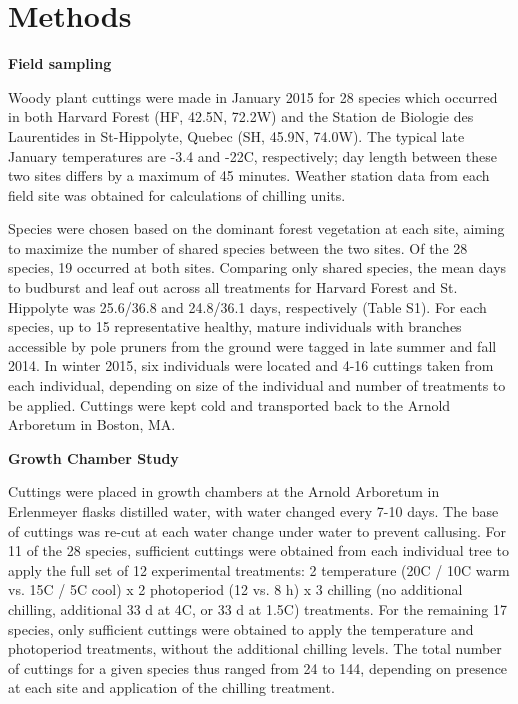 \documentclass[11pt]{article}
\begin{document}
\section*{Methods}
\textbf{Field sampling}

Woody plant cuttings were made in January 2015 for 28 species which occurred in both Harvard Forest (HF, 42.5\degree N, 72.2\degree W) and the Station de Biologie des Laurentides in St-Hippolyte, Quebec (SH, 45.9\degree N, 74.0\degree W). The typical late January temperatures are -3.4 and -22\degree C, respectively; day length between these two sites differs by a maximum of 45 minutes. Weather station data from each field site was obtained for calculations of chilling units. 

Species were chosen based on the dominant forest vegetation at each site, aiming to maximize the number of shared species between the two sites. Of the 28 species, 19 occurred at both sites. Comparing only shared species, the mean days to budburst and leaf out across all treatments for Harvard Forest and St. Hippolyte was 25.6/36.8 and 24.8/36.1 days, respectively (Table S1). For each species, up to 15 representative healthy, mature individuals with branches accessible by pole pruners from the ground were tagged in late summer and fall 2014. In winter 2015, six individuals were located and 4-16 cuttings taken from each individual, depending on size of the individual and number of treatments to be applied. Cuttings were kept cold and transported back to the Arnold Arboretum in Boston, MA.

\textbf{Growth Chamber Study}

Cuttings were placed in growth chambers at the Arnold Arboretum in Erlenmeyer flasks distilled water, with water changed every 7-10 days. The base of cuttings was re-cut at each water change under water to prevent callusing. For 11 of the 28 species, sufficient cuttings were obtained from each individual tree to apply the full set of 12 experimental treatments: 2 temperature (20\degree C / 10\degree C warm vs. 15\degree C / 5\degree C cool) x 2 photoperiod (12 vs. 8 h) x 3 chilling (no additional chilling,  additional 33 d at 4\degree C, or 33 d at 1.5\degree C) treatments. For the remaining 17 species, only sufficient cuttings were obtained to apply the temperature and photoperiod treatments, without the additional chilling levels. The total number of cuttings for a given species thus ranged from 24 to 144, depending on presence at each site and application of the chilling treatment.
\end{document}
